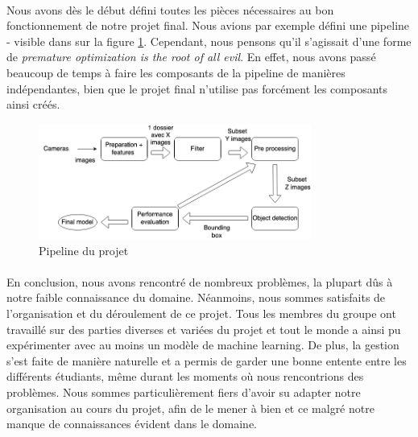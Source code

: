 \paragraph{} Nous avons dès le début défini toutes les pièces nécessaires au bon fonctionnement de notre projet final. Nous avions par exemple défini une pipeline - visible dans sur la figure \ref{fig:pipeline}. Cependant, nous pensons qu'il s'agissait d'une forme de \textit{premature optimization is the root of all evil}. En effet, nous avons passé beaucoup de temps à faire les composants de la pipeline de manières indépendantes, bien que le projet final n'utilise pas forcément les composants ainsi créés.
\begin{figure}[H]
    \centering
    \includegraphics[width=0.8\textwidth]{images/pipeline.png}
    \caption{Pipeline du projet}    
    \label{fig:pipeline}
\end{figure}
\paragraph{} En conclusion, nous avons rencontré de nombreux problèmes, la plupart dûs à notre faible connaissance du domaine. Néanmoins, nous sommes satisfaits de l'organisation et du déroulement de ce projet. Tous les membres du groupe ont travaillé sur des parties diverses et variées du projet et tout le monde a ainsi pu expérimenter avec au moins un modèle de machine learning. De plus, la gestion s'est faite de manière naturelle et a permis de garder une bonne entente entre les différents étudiants, même durant les moments où nous rencontrions des problèmes. Nous sommes particulièrement fiers d'avoir su adapter notre organisation au cours du projet, afin de le mener à bien et ce malgré notre manque de connaissances évident dans le domaine.